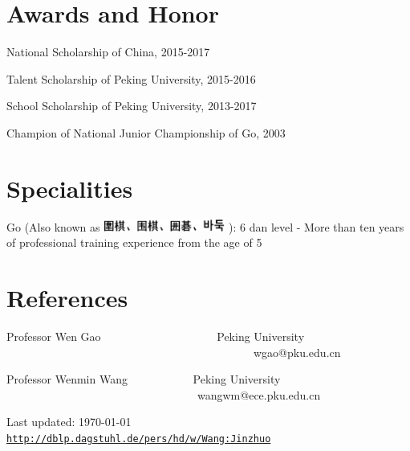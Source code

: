 \documentclass[letterpaper]{article}
\def\footerlink{http://dblp.dagstuhl.de/pers/hd/w/Wang:Jinzhuo}
\renewenvironment{itemize}{
  \begin{list}{}{
    \setlength{\leftmargin}{1.5em}
  }
}{
  \end{list}
}
\begin{document}
\section*{Awards and Honor}

\begin{itemize}
    \item National Scholarship of China, 2015-2017
    \item Talent Scholarship of Peking University, 2015-2016
    \item School Scholarship of Peking University, 2013-2017
    \item Champion of National Junior Championship of Go, 2003
\end{itemize}


\section*{Specialities}

\begin{itemize}
    \item Go (Also known as \includegraphics[width=4cm]{gogo.png} ): 6 dan level - More than ten years of professional training experience from the age of 5
\end{itemize}

\section*{References}

\begin{itemize}
    \item   Professor Wen Gao    \ \ \ \ \ \ \ \    \ \ \ \ \ \ \ \   \   \  \  \ Peking University  \ \ \ \ \ \ \ \ \ \ \ \ \ \ \ \ \ \ \ \ \  \ \ \ \ \ \ \ \ \ \ \ \ \ \ \ \ \ \ \ \ \ \ \ wgao@pku.edu.cn
    \item   Professor Wenmin Wang \ \ \ \ \ \ \ \ \ \ \ Peking University  \ \ \ \ \ \ \ \ \ \ \ \ \ \ \ \ \ \ \ \ \ \ \ \ \ \ \ \ \ \ \  \ \ \ wangwm@ece.pku.edu.cn
\end{itemize}


\bigskip
\bigskip

\begin{center}
  \begin{footnotesize}
    Last updated: \today \\
    \href{\footerlink}{\texttt{\footerlink}}
  \end{footnotesize}
\end{center}
\end{document}
